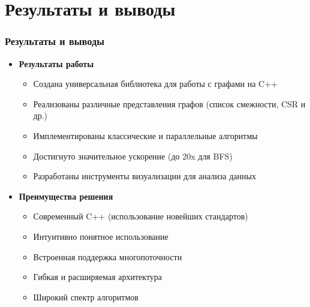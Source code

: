 \documentclass[aspectratio=169]{beamer}
\begin{document}
\section{Результаты и выводы}
\begin{frame}
  \frametitle{Результаты и выводы}
  \begin{itemize}
    \item \textbf{Результаты работы}
      \begin{itemize}
        \item Создана универсальная библиотека для работы с графами на C++
        \item Реализованы различные представления графов (список смежности, CSR и др.)
        \item Имплементированы классические и параллельные алгоритмы
        \item Достигнуто значительное ускорение (до 20x для BFS)
        \item Разработаны инструменты визуализации для анализа данных
      \end{itemize}
    \item \textbf{Преимущества решения}
      \begin{itemize}
        \item Современный C++ (использование новейших стандартов)
        \item Интуитивно понятное использование
        \item Встроенная поддержка многопоточности
        \item Гибкая и расширяемая архитектура
        \item Широкий спектр алгоритмов
      \end{itemize}
  \end{itemize}
\end{frame}
\end{document}
